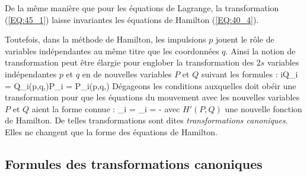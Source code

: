 De la m\^{e}me mani\`{e}re que pour les \'{e}quations de Lagrange, la transformation (\ref{EQ:45_1}) laisse invariantes les \'{e}quations de Hamilton (\ref{EQ:40_4}).

Toutefois, dans la m\'{e}thode de Hamilton, les impulsions $p$ jouent le r\^{o}le de variables ind\'{e}pendantes au m\^{e}me titre que les coordonn\'{e}es $q$. Ainsi la notion de transformation peut \^{e}tre \'{e}largie pour englober la transformation des $2s$ variables ind\'{e}pendantes $p$ et $q$ en de nouvelles variables $P$ et $Q$ suivant les formules :
\be
	\forall i\text{, }Q_{i} = Q_{i}(p,q,)P_{i} = P_{i}(p,q,) \label{EQ:45_2}
\ee
D\'{e}gageons les conditions auxquelles doit ob\'{e}ir une transformation pour que les \'{e}quations du mouvement avec les nouvelles variables $P$ et $Q$ aient la forme connue :
\be
	_{i} = _{i} = - \label{EQ:45_3}
\ee
avec $H'(P,Q)$ une nouvelle fonction de Hamilton. De telles transformations sont dites \emph{transformations canoniques}. Elles ne changent que la forme des \'{e}quations de Hamilton.

\subsection{Formules des transformations canoniques}\label{PAR:45_1}

